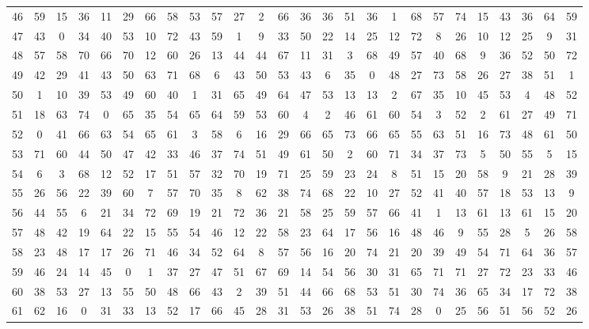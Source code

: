 \begin{table}
\begin{tabular}{c c c c c c c c c c c c c c c c c c c c c c c c c c }
46 & 59 & 15 & 36 & 11 & 29 & 66 & 58 & 53 & 57 & 27 & 2 & 66 & 36 & 36 & 51 & 36 & 1 & 68 & 57 & 74 & 15 & 43 & 36 & 64 & 59 \\
47 & 43 & 0 & 34 & 40 & 53 & 10 & 72 & 43 & 59 & 1 & 9 & 33 & 50 & 22 & 14 & 25 & 12 & 72 & 8 & 26 & 10 & 12 & 25 & 9 & 31 \\
48 & 57 & 58 & 70 & 66 & 70 & 12 & 60 & 26 & 13 & 44 & 44 & 67 & 11 & 31 & 3 & 68 & 49 & 57 & 40 & 68 & 9 & 36 & 52 & 50 & 72 \\
49 & 42 & 29 & 41 & 43 & 50 & 63 & 71 & 68 & 6 & 43 & 50 & 53 & 43 & 6 & 35 & 0 & 48 & 27 & 73 & 58 & 26 & 27 & 38 & 51 & 1 \\
50 & 1 & 10 & 39 & 53 & 49 & 60 & 40 & 1 & 31 & 65 & 49 & 64 & 47 & 53 & 13 & 13 & 2 & 67 & 35 & 10 & 45 & 53 & 4 & 48 & 52 \\
51 & 18 & 63 & 74 & 0 & 65 & 35 & 54 & 65 & 64 & 59 & 53 & 60 & 4 & 2 & 46 & 61 & 60 & 54 & 3 & 52 & 2 & 61 & 27 & 49 & 71 \\
52 & 0 & 41 & 66 & 63 & 54 & 65 & 61 & 3 & 58 & 6 & 16 & 29 & 66 & 65 & 73 & 66 & 65 & 55 & 63 & 51 & 16 & 73 & 48 & 61 & 50 \\
53 & 71 & 60 & 44 & 50 & 47 & 42 & 33 & 46 & 37 & 74 & 51 & 49 & 61 & 50 & 2 & 60 & 71 & 34 & 37 & 73 & 5 & 50 & 55 & 5 & 15 \\
54 & 6 & 3 & 68 & 12 & 52 & 17 & 51 & 57 & 32 & 70 & 19 & 71 & 25 & 59 & 23 & 24 & 8 & 51 & 15 & 20 & 58 & 9 & 21 & 28 & 39 \\
55 & 26 & 56 & 22 & 39 & 60 & 7 & 57 & 70 & 35 & 8 & 62 & 38 & 74 & 68 & 22 & 10 & 27 & 52 & 41 & 40 & 57 & 18 & 53 & 13 & 9 \\
56 & 44 & 55 & 6 & 21 & 34 & 72 & 69 & 19 & 21 & 72 & 36 & 21 & 58 & 25 & 59 & 57 & 66 & 41 & 1 & 13 & 61 & 13 & 61 & 15 & 20 \\
57 & 48 & 42 & 19 & 64 & 22 & 15 & 55 & 54 & 46 & 12 & 22 & 58 & 23 & 64 & 17 & 56 & 16 & 48 & 46 & 9 & 55 & 28 & 5 & 26 & 58 \\
58 & 23 & 48 & 17 & 17 & 26 & 71 & 46 & 34 & 52 & 64 & 8 & 57 & 56 & 16 & 20 & 74 & 21 & 20 & 39 & 49 & 54 & 71 & 64 & 36 & 57 \\
59 & 46 & 24 & 14 & 45 & 0 & 1 & 37 & 27 & 47 & 51 & 67 & 69 & 14 & 54 & 56 & 30 & 31 & 65 & 71 & 71 & 27 & 72 & 23 & 33 & 46 \\
60 & 38 & 53 & 27 & 13 & 55 & 50 & 48 & 66 & 43 & 2 & 39 & 51 & 44 & 66 & 68 & 53 & 51 & 30 & 74 & 36 & 65 & 34 & 17 & 72 & 38 \\
61 & 62 & 16 & 0 & 31 & 33 & 13 & 52 & 17 & 66 & 45 & 28 & 31 & 53 & 26 & 38 & 51 & 74 & 28 & 0 & 25 & 56 & 51 & 56 & 52 & 26 \\

\end{tabular}
\end{table}
